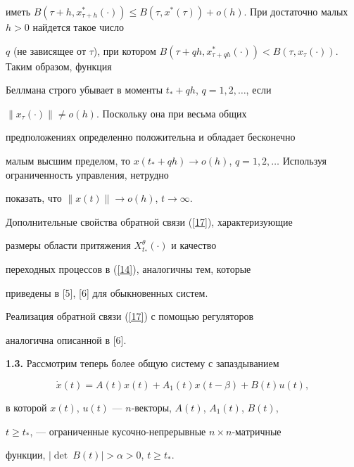 иметь $B(\tau+h, x_{\tau+h}^*(\cdot)) \le B(\tau,


x^*(\tau))+o(h)$. При достаточно малых $h>0$ найдется такое число


$q$ (не зависящее от $\tau$), при котором $B(\tau+qh, x^*_{\tau+qh


}(\cdot)) < B(\tau,x_{\tau}(\cdot))$. Таким образом, функция


Беллмана строго убывает в моменты $t_*+qh$, $q=1,2,\dotsc$, если


$\|x_{\tau}(\cdot)\| \ne o(h)$. Поскольку она при весьма общих


предположениях определенно положительна и обладает бесконечно


малым высшим пределом, то $x(t_{*}+qh) \rightarrow o(h)$, $q =


1,2,\dotsc$ Используя ограниченность управления, нетрудно


показать, что $\|x(t)\| \rightarrow o(h)$, $t \rightarrow \infty$.





Дополнительные свойства обратной связи (\ref{17}), характеризующие


размеры области притяжения $X_{t_*}^{\theta}(\cdot)$ и качество


переходных процессов в (\ref{14}), аналогичны тем, которые


приведены в [5], [6] для обыкновенных систем.





Реализация обратной связи (\ref{17}) с помощью регуляторов


аналогична описанной в [6].


\medskip





{\bf 1.3.} Рассмотрим теперь более общую систему с запаздыванием


\begin{equation}\label{18}


\Dot x(t)=A(t)x(t)+A_1(t)x(t-\beta)+B(t)u(t),


\end{equation}


в которой $x(t)$, $u(t)$ --- $n$-векторы, $A(t)$, $A_{1}(t)$, $B(t)$,


$t\ge t_*$, --- ограниченные кусочно-непрерывные $n \times n$-матричные


функции, $|\det \ B(t)| > \alpha > 0$, $t \ge t_*$.





